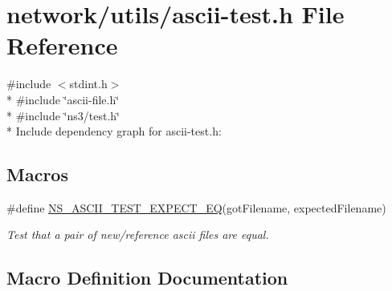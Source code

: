 \hypertarget{ascii-test_8h}{}\section{network/utils/ascii-\/test.h File Reference}
\label{ascii-test_8h}
{\ttfamily \#include $<$stdint.\+h$>$}\\*
{\ttfamily \#include \char`\"{}ascii-\/file.\+h\char`\"{}}\\*
{\ttfamily \#include \char`\"{}ns3/test.\+h\char`\"{}}\\*
Include dependency graph for ascii-\/test.h\+:
\subsection*{Macros}
\begin{DoxyCompactItemize}
\item 
\#define \hyperlink{ascii-test_8h_a6e939f2cd8a620a9806147b989fbaf5a}{N\+S\+\_\+\+A\+S\+C\+I\+I\+\_\+\+T\+E\+S\+T\+\_\+\+E\+X\+P\+E\+C\+T\+\_\+\+EQ}(got\+Filename,  expected\+Filename)
\begin{DoxyCompactList}\small\item\em Test that a pair of new/reference ascii files are equal. \end{DoxyCompactList}\end{DoxyCompactItemize}


\subsection{Macro Definition Documentation}
